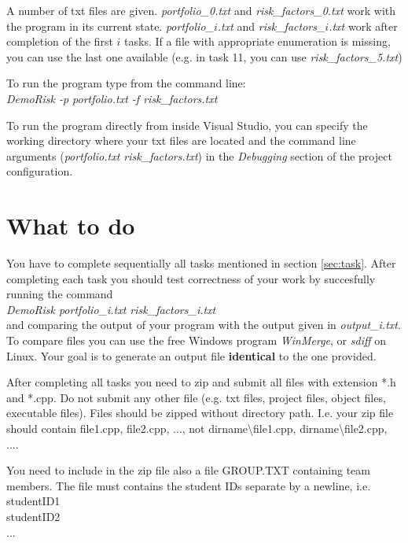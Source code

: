 \documentclass[10pt]{article}
\begin{document}
A number of txt files are given. \textit{portfolio\_0.txt} and \textit{risk\_factors\_0.txt} work with the program in its current state. \textit{portfolio\_$i$.txt} and \textit{risk\_factors\_$i$.txt} work after completion of the first $i$ tasks. If a file with appropriate enumeration is missing, you can use the last one available (e.g. in task 11, you can use \textit{risk\_factors\_5.txt})

To run the program type from the command line:\\
\textit{DemoRisk -p portfolio.txt -f risk\_factors.txt}

To run the program directly from inside Visual Studio, you can specify the working directory where your txt files are located and the command line arguments (\textit{portfolio.txt risk\_factors.txt}) in the \textit{Debugging} section of the project configuration.

\section{What to do}
You have to complete sequentially all tasks mentioned in section \ref{sec:task}. After completing each task you should test correctness of your work by succesfully running the command \\
\textit{DemoRisk portfolio\_i.txt risk\_factors\_i.txt}\\
and comparing the output of your program with the output given in \textit{output\_i.txt}.
To compare files you can use the free Windows program \textit{WinMerge}, or \textit{sdiff} on Linux. Your goal is to generate an output file \textbf{identical} to the one provided.

After completing all tasks you need to zip and submit all files with extension *.h and *.cpp. Do not submit any other file (e.g. txt files, project files, object files, executable files). Files should be zipped without directory path. I.e. your zip file should contain file1.cpp, file2.cpp, ..., not dirname\textbackslash file1.cpp, dirname\textbackslash file2.cpp, ....

You need to include in the zip file also a file GROUP.TXT containing team members. The file must contains the student IDs separate by a newline, i.e.
\\ \indent studentID1
\\ \indent  studentID2
\\ \indent  ...
\end{document}
